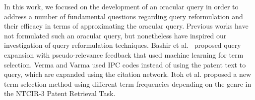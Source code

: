 



In this work, we focused on the development of an oracular query in
order to address a number of fundamental questions regarding query reformulation
and their efficacy in terms of approximating the oracular query.
Previous works have not formulated such an oracular query, but nonetheless
have inspired our investigation of query reformulation techniques.
Bashir et al.~\cite{Bashir2010} proposed query expansion with pseudo-relevance
feedback that used machine learning for term selection.
Verma and Varma
\cite{Verma2011} used IPC codes instead of using
the patent text to query, which are expanded using the citation network.
Itoh et al. \cite{Itoh2003} proposed a new term selection method using different term
frequencies depending on the genre in the NTCIR-3 Patent Retrieval Task.
